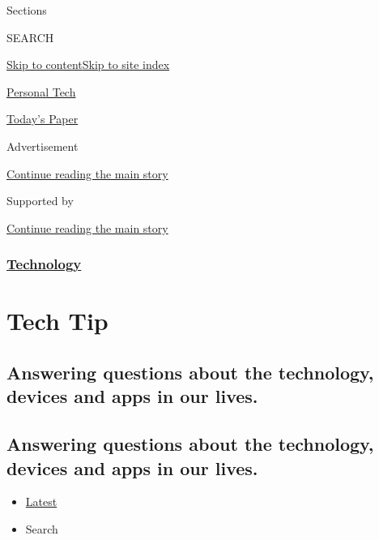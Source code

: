 Sections

SEARCH

\protect\hyperlink{site-content}{Skip to
content}\protect\hyperlink{site-index}{Skip to site index}

\href{https://www.nytimes3xbfgragh.onion/section/technology/personaltech}{Personal
Tech}

\href{https://myaccount.nytimes3xbfgragh.onion/auth/login?response_type=cookie\&client_id=vi}{}

\href{https://www.nytimes3xbfgragh.onion/section/todayspaper}{Today's
Paper}

Advertisement

\protect\hyperlink{after-top}{Continue reading the main story}

Supported by

\protect\hyperlink{after-sponsor}{Continue reading the main story}

\hypertarget{technology}{%
\subsubsection{\texorpdfstring{\href{/section/technology}{Technology}}{Technology}}\label{technology}}

\hypertarget{tech-tip}{%
\section{Tech Tip}\label{tech-tip}}

\hypertarget{answering-questions-about-the-technology-devices-and-apps-in-our-lives}{%
\subsection{Answering questions about the technology, devices and apps
in our
lives.}\label{answering-questions-about-the-technology-devices-and-apps-in-our-lives}}

\hypertarget{answering-questions-about-the-technology-devices-and-apps-in-our-lives-1}{%
\subsection{Answering questions about the technology, devices and apps
in our
lives.}\label{answering-questions-about-the-technology-devices-and-apps-in-our-lives-1}}

\begin{itemize}
\tightlist
\item
  \protect\hyperlink{stream-panel}{Latest}
\item
  Search
\end{itemize}

